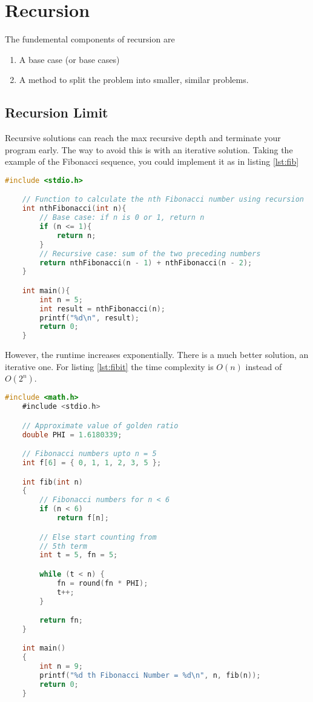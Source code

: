 \section{Recursion}

The fundemental components of recursion are
\begin{enumerate}
    \item A base case (or base cases)
    \item A method to split the problem into smaller, similar problems.
\end{enumerate}

\subsection{Recursion Limit}

Recursive solutions can reach the max recursive depth and
terminate your program early. The way to avoid this is with
an iterative solution. Taking the example of the Fibonacci
sequence, you could implement it as in listing \ref{lst:fib}

\begin{lstlisting}[language=C, label={lst:fib}, caption=Singly Linked List Node Structure]
    #include <stdio.h>

    // Function to calculate the nth Fibonacci number using recursion
    int nthFibonacci(int n){
        // Base case: if n is 0 or 1, return n
        if (n <= 1){
            return n;
        }
        // Recursive case: sum of the two preceding numbers
        return nthFibonacci(n - 1) + nthFibonacci(n - 2);
    }

    int main(){
        int n = 5;
        int result = nthFibonacci(n);
        printf("%d\n", result);
        return 0;
    }
\end{lstlisting}

However, the runtime increases exponentially.
There is a much better solution, an iterative one.
For listing \ref{lst:fibit} the time complexity is $O(n)$
instead of $O(2^n)$.

\begin{lstlisting}[language=C, label={lst:fibit}, caption=Singly Linked List Node Structure]
    #include <math.h>
    #include <stdio.h>

    // Approximate value of golden ratio
    double PHI = 1.6180339;

    // Fibonacci numbers upto n = 5
    int f[6] = { 0, 1, 1, 2, 3, 5 };

    int fib(int n)
    {
        // Fibonacci numbers for n < 6
        if (n < 6)
            return f[n];

        // Else start counting from
        // 5th term
        int t = 5, fn = 5;

        while (t < n) {
            fn = round(fn * PHI);
            t++;
        }

        return fn;
    }

    int main()
    {
        int n = 9;
        printf("%d th Fibonacci Number = %d\n", n, fib(n));
        return 0;
    }
\end{lstlisting}

